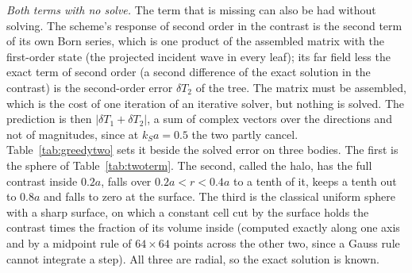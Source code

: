 \documentclass[11pt,a4paper]{article}
\begin{document}
\emph{Both terms with no solve.} The term that is missing can also be had without solving. The scheme's
response of second order in the contrast is the second term of its own Born series, which is one product
of the assembled matrix with the first-order state (the projected incident wave in every leaf); its
far field less the exact term of second order (a second difference of the exact solution in the contrast)
is the second-order error $\delta T_2$ of the tree. The matrix must be assembled, which is the cost of one
iteration of an iterative solver, but nothing is solved. The prediction is then $|\delta T_1+\delta T_2|$,
a sum of complex vectors over the directions and not of magnitudes, since at $k_Sa=0.5$ the two partly
cancel. Table~\ref{tab:greedytwo} sets it beside the solved error on three bodies. The first is the sphere
of Table~\ref{tab:twoterm}. The second, called the halo, has the full contrast inside $0.2a$, falls over
$0.2a<r<0.4a$ to a tenth of it, keeps a tenth out to $0.8a$ and falls to zero at the surface. The third is
the classical uniform sphere with a sharp surface, on which a constant cell cut by the surface holds the
contrast times the fraction of its volume inside (computed exactly along one axis and by a midpoint rule
of $64\times64$ points across the other two, since a Gauss rule cannot integrate a step). All three are
radial, so the exact solution is known.
\end{document}
